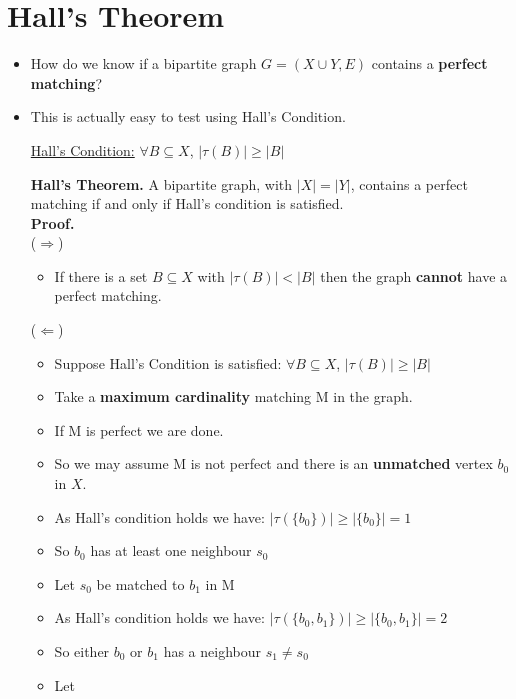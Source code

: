 \documentclass[12pt]{article}
\begin{document}
\section{Hall's Theorem}
\renewcommand{\labelitemii}{$\circ$}
\renewcommand{\labelitemiii}{$\cdot$}
\renewcommand{\labelitemiii}{$\rightarrow$}
\renewcommand{\labelitemiv}{$\star$}
\begin{itemize}
\item How do we know if a bipartite graph $G = (X \cup Y, E)$ contains a \textbf{perfect matching}?
\item This is actually easy to test using Hall's Condition.
\begin{center}
\underline{Hall's Condition:} $\forall B \subseteq X$, $|\tau(B)| \geq |B|$
\end{center}
\textbf{Hall's Theorem.}  A bipartite graph, with $|X| = |Y|$, contains a perfect matching if and only if Hall's condition is satisfied.\\
\textbf{Proof.}\\
($\Rightarrow$)
	\begin{itemize}
	\item If there is a set $B \subseteq X$ with $|\tau(B)| < |B|$ then the graph \textbf{cannot} have a perfect matching.
	\end{itemize}
($\Leftarrow$)
	\begin{itemize}
	\item Suppose Hall's Condition is satisfied: $\forall B \subseteq X$, $|\tau(B)| \geq |B|$
	\item Take a \textbf{maximum cardinality} matching M in the graph.
	\item If M is perfect we are done.
	\item So we may assume M is not perfect and there is an \textbf{unmatched} vertex $b_0$ in $X$.
	\item As Hall's condition holds we have: $|\tau(\{b_0\})| \geq |\{b_0\}| = 1$
	\item So $b_0$ has at least one neighbour $s_0$
	\item Let $s_0$ be matched to $b_1$ in M
	\item As Hall's condition holds we have: $|\tau(\{b_0, b_1\})| \geq |\{b_0, b_1\}| = 2$
	\item So either $b_0$ or $b_1$ has a neighbour $s_1 \neq s_0$
	\item Let $$
	\end{itemize}
\end{itemize}
\end{document}
